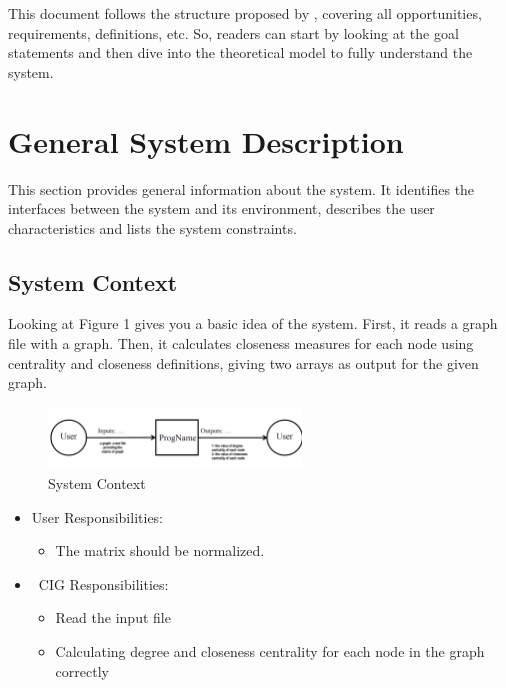 \documentclass[12pt]{article}
\begin{document}
This document follows the structure proposed by \citet{SmithandLai2005}, covering all opportunities, requirements, definitions, etc. So, readers can start by looking at the goal statements and then dive into the theoretical model to fully understand the system.

\section{General System Description}

This section provides general information about the system.  It identifies the
interfaces between the system and its environment, describes the user
characteristics and lists the system constraints. 

\subsection{System Context}


Looking at Figure 1 gives you a basic idea of the system. First, it reads a graph file with a graph. Then, it calculates closeness measures for each node using centrality and closeness definitions, giving two arrays as output for the given graph.

\begin{figure}[h!]
\begin{center}
 \includegraphics[width=0.6\textwidth]{srspicture}
\caption{System Context}
\label{Fig_SystemContext} 
\end{center}
\end{figure}


\begin{itemize}
\item User Responsibilities: 
\begin{itemize}
\item The matrix should be normalized.
\end{itemize}
\item \ CIG Responsibilities:
\begin{itemize}
\item Read the input file
\item Calculating degree and closeness centrality for each node in the graph correctly
\end{itemize}
\end{itemize}
\end{document}
